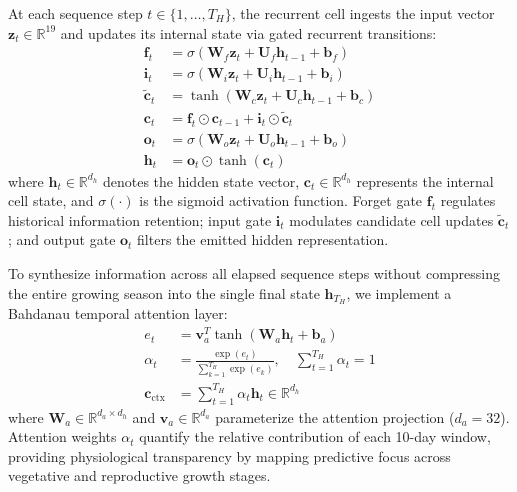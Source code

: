 At each sequence step $t \in \{1, \dots, T_H\}$, the recurrent cell ingests the input vector $\mathbf{z}_t \in \mathbb{R}^{19}$ and updates its internal state via gated recurrent transitions:
\begin{align}
    \mathbf{f}_t &= \sigma\left(\mathbf{W}_f \mathbf{z}_t + \mathbf{U}_f \mathbf{h}_{t-1} + \mathbf{b}_f\right) \label{eq:lstm_f} \\
    \mathbf{i}_t &= \sigma\left(\mathbf{W}_i \mathbf{z}_t + \mathbf{U}_i \mathbf{h}_{t-1} + \mathbf{b}_i\right) \label{eq:lstm_i} \\
    \tilde{\mathbf{c}}_t &= \tanh\left(\mathbf{W}_c \mathbf{z}_t + \mathbf{U}_c \mathbf{h}_{t-1} + \mathbf{b}_c\right) \label{eq:lstm_c_tilde} \\
    \mathbf{c}_t &= \mathbf{f}_t \odot \mathbf{c}_{t-1} + \mathbf{i}_t \odot \tilde{\mathbf{c}}_t \label{eq:lstm_c} \\
    \mathbf{o}_t &= \sigma\left(\mathbf{W}_o \mathbf{z}_t + \mathbf{U}_o \mathbf{h}_{t-1} + \mathbf{b}_o\right) \label{eq:lstm_o} \\
    \mathbf{h}_t &= \mathbf{o}_t \odot \tanh\left(\mathbf{c}_t\right) \label{eq:lstm_h}
\end{align}
where $\mathbf{h}_t \in \mathbb{R}^{d_h}$ denotes the hidden state vector, $\mathbf{c}_t \in \mathbb{R}^{d_h}$ represents the internal cell state, and $\sigma(\cdot)$ is the sigmoid activation function. Forget gate $\mathbf{f}_t$ regulates historical information retention; input gate $\mathbf{i}_t$ modulates candidate cell updates $\tilde{\mathbf{c}}_t$; and output gate $\mathbf{o}_t$ filters the emitted hidden representation.

To synthesize information across all elapsed sequence steps without compressing the entire growing season into the single final state $\mathbf{h}_{T_H}$, we implement a Bahdanau temporal attention layer:
\begin{align}
    e_t &= \mathbf{v}_a^T \tanh\left(\mathbf{W}_a \mathbf{h}_t + \mathbf{b}_a\right) \label{eq:attention_score} \\
    \alpha_t &= \frac{\exp(e_t)}{\sum_{k=1}^{T_H} \exp(e_k)}, \quad \sum_{t=1}^{T_H} \alpha_t = 1 \label{eq:attention_weights} \\
    \mathbf{c}_{\text{ctx}} &= \sum_{t=1}^{T_H} \alpha_t \mathbf{h}_t \in \mathbb{R}^{d_h} \label{eq:context_vector}
\end{align}
where $\mathbf{W}_a \in \mathbb{R}^{d_a \times d_h}$ and $\mathbf{v}_a \in \mathbb{R}^{d_a}$ parameterize the attention projection ($d_a = 32$). Attention weights $\alpha_t$ quantify the relative contribution of each 10-day window, providing physiological transparency by mapping predictive focus across vegetative and reproductive growth stages.

